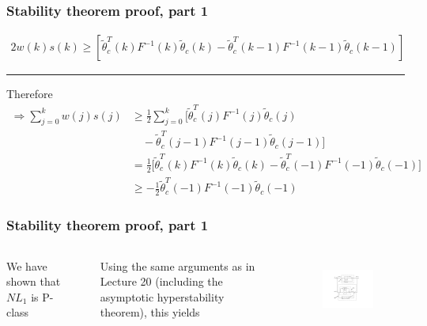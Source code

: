 \begin{frame}
    \frametitle{Stability theorem proof, part 1}

    \begin{align*}
         2 w(k) s(k) \geq \left[ \tilde{\theta}_c^T(k) F^{-1}(k) \tilde{\theta}_c(k)
            - \tilde{\theta}_c^T(k-1) F^{-1}(k-1) \tilde{\theta}_c(k-1) \right]
    \end{align*}
    \hrule{\hfill}
    
    Therefore
    \begin{align*}
        \Rightarrow \sum_{j=0}^k w(j) s(j) & \geq \frac{1}{2} \sum_{j=0}^k \Bigg[
            \tilde{\theta}_c^T(j) F^{-1}(j) \tilde{\theta}_c(j) \\
        & \quad - \tilde{\theta}_c^T(j-1) F^{-1}(j-1) \tilde{\theta}_c(j-1) \Bigg] \\
        & = \frac{1}{2} \Bigg[ \tilde{\theta}_c^T(k) F^{-1}(k) \tilde{\theta}_c(k)
            - \tilde{\theta}_c^T(-1) F^{-1}(-1) \tilde{\theta}_c(-1) \Bigg] \\
        & \geq - \frac{1}{2} \tilde{\theta}_c^T(-1) F^{-1}(-1) \tilde{\theta}_c(-1)
    \end{align*}
\end{frame}

\begin{frame}
    \frametitle{Stability theorem proof, part 1}

    \begin{columns}[c]
        We have shown that $NL_1$ is P-class

        $ \ $

        Using the same arguments as in Lecture 20 (including the asymptotic hyperstability theorem), this yields

        \begin{figure}[h]
            \centering
            \includegraphics[width=5cm]{figs_hyperstability}\\
        \end{figure}
    \end{columns}

\end{frame}

